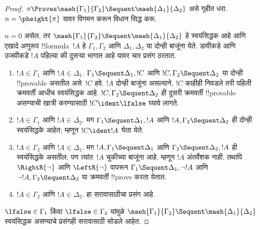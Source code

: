 \documentclass[../../../include/open-logic-section]{subfiles}
\begin{document}
\begin{proof}
  $\pi \Proves \maeh{\Gamma_1}{\Gamma_2} \Sequent
  \maeh{\Delta_1}{\Delta_2}$ असे गृहीत धरा.
  $n=\pheight{\pi}$ यावर विगमन करून विधान सिद्ध करू.

  $n=0$ असेल, तर
  $\maeh{\Gamma_1}{\Gamma_2} \Sequent
  \maeh{\Delta_1}{\Delta_2}$ हे स्वयंसिद्धक आहे
  आणि एखादे अणुरूप !!{formula}~$!A$
  हे $\Gamma_1, \Gamma_2$ आणि
  $\Delta_1, \Delta_2$ या दोन्ही बाजूंना येते.
  डावीकडे आणि उजवीकडे $!A$ पहिल्या की
  दुसऱ्या भागात आहे यावर चार प्रसंग ठरतात.
  \begin{enumerate}
    \item $!A \in \Gamma_1$ आणि $!A \in \Delta_1$.
    $\Gamma_1 \Sequent \Delta_1, !C$ आणि
    $!C, \Gamma_2 \Sequent \Delta_2$ या दोन्ही
    !!{provable} असतील असे~$!C$ हवे.
    $!A$ दोन्ही बाजूंना असल्याने, $!C$ काहीही
    निवडले तरी पहिली क्रमवर्ती आधीच स्वयंसिद्धक आहे.
    $!C, \Gamma_2 \Sequent \Delta_2$ ही दुसरी
    क्रमवर्ती !!{provable} असण्याची खात्री
    करण्यासाठी $!C \ident \lfalse$ घ्यावे लागते.
    \item $!A \in \Gamma_1$ आणि $!A \in \Delta_2$.
    मग $\Gamma_1 \Sequent \Delta_1, !A$ आणि
    $!A, \Gamma_2 \Sequent \Delta_2$ ही दोन्ही
    स्वयंसिद्धके आहेत; म्हणून $!C \ident !A$ घेता येते.
    \item $!A \in \Gamma_2$ आणि $!A \in \Delta_1$.
    मग $!A, \Gamma_1 \Sequent \Delta_1$ आणि
    $\Gamma_2 \Sequent \Delta_2, !A$ ही स्वयंसिद्धके
    असतील; पण त्यांत~$!A$ चुकीच्या बाजूंना आहे.
    म्हणून $!A$ अंतर्वेशक नाही.
    तथापि $\RightR{\lnot}$ आणि $\LeftR{\lnot}$
    वापरून $\Gamma_1
    \Sequent \Delta_1, \lnot!A$ आणि
    $\lnot !A, \Gamma_2 \Sequent
    \Delta_2$ या क्रमवर्ती !!{prove} करता येतात.
    \item $!A \in \Gamma_2$ आणि $!A \in \Delta_2$.
    हा सरावासाठीचा प्रसंग आहे.
  \end{enumerate}
  $\lfalse \in \Gamma_1$ किंवा
  $\lfalse \in \Gamma_2$ यांमुळे
  $\maeh{\Gamma_1}{\Gamma_2} \Sequent
  \maeh{\Delta_1}{\Delta_2}$ स्वयंसिद्धक असण्याचे
  प्रसंगही सरावासाठी सोडले आहेत.


\end{proof}
\end{document}
